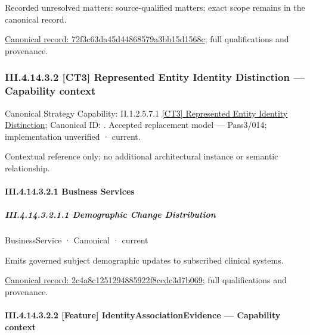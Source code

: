 {\small Recorded unresolved matters: source-qualified matters; exact scope remains in the canonical record.}\par
{\footnotesize \href{../../../../../../../continuum/business/business-process/72f3c63da45d44868579a3bb15d1568c.md}{Canonical record: 72f3c63da45d44868579a3bb15d1568c}; full qualifications and provenance.}\par
\subsubsection*{III.4.14.3.2 [CT3] Represented Entity Identity Distinction — Capability context}
\label{navigation:III.4.14.3.2}

{\small Canonical Strategy Capability: II.1.2.5.7.1 \hyperref[element:d403533b88f243d0aa555a3a7566b5d1]{[CT3] Represented Entity Identity Distinction}; Canonical ID: \texttt{}. Accepted replacement model — Pass3/014; implementation unverified · current.}\par
Contextual reference only; no additional architectural instance or semantic relationship.\par
\paragraph*{III.4.14.3.2.1 Business Services}
\label{navigation:III.4.14.3.2.1}

\subparagraph*{III.4.14.3.2.1.1 Demographic Change Distribution}
\label{navigation:III.4.14.3.2.1.1}

\label{element:2c4a8c1251294885922f8ccdc3d7b069}
{\small BusinessService · Canonical · current}\par

Emits governed subject demographic updates to subscribed clinical systems.


{\footnotesize \href{../../../../../../../continuum/business/business-service/2c4a8c1251294885922f8ccdc3d7b069.md}{Canonical record: 2c4a8c1251294885922f8ccdc3d7b069}; full qualifications and provenance.}\par
\paragraph*{III.4.14.3.2.2 [Feature] IdentityAssociationEvidence — Capability context}
\label{navigation:III.4.14.3.2.2}

